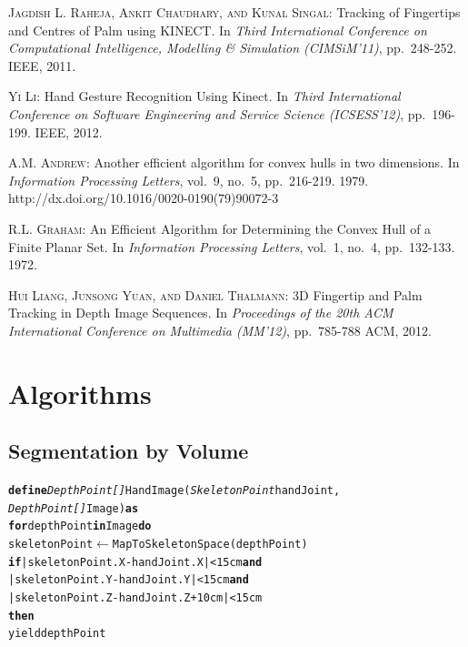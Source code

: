 \documentclass[12pt]{article}
\begin{document}
\begin{thebibliography}{9}

\textsc{Jagdish L. Raheja, Ankit Chaudhary, and Kunal Singal}:
Tracking of Fingertips and Centres of Palm using KINECT.
In \textit{Third International Conference on Computational Intelligence, Modelling \& Simulation (CIMSiM'11)},
pp.~248-252.
IEEE, 2011.

\textsc{Yi Li}:
Hand Gesture Recognition Using Kinect.
In \textit{Third International Conference on Software Engineering and Service Science (ICSESS'12)},
pp.~196-199.
IEEE, 2012.

\textsc{A.M. Andrew}:
Another efficient algorithm for convex hulls in two dimensions.
In \textit{Information Processing Letters},
vol.~9, no.~5, pp.~216-219.
1979.
http://dx.doi.org/10.1016/0020-0190(79)90072-3

\textsc{R.L. Graham}:
An Efficient Algorithm for Determining the Convex Hull of a Finite Planar Set.
In \textit{Information Processing Letters},
vol.~1, no.~4, pp.~132-133.
1972.

\textsc{Hui Liang, Junsong Yuan, and Daniel Thalmann}:
3D Fingertip and Palm Tracking in Depth Image Sequences.
In \textit{Proceedings of the 20th ACM International Conference on Multimedia (MM'12)},
pp.~785-788
ACM, 2012.

\end{thebibliography}


\newpage
\appendix
\section{Algorithms}

\subsection{Segmentation by Volume}
\begin{small}
\begin{alltt}
\textbf{define} \textit{DepthPoint[]} HandImage(\textit{SkeletonPoint} handJoint,
                              \textit{DepthPoint[]} Image) \textbf{as}
    \textbf{for} depthPoint \textbf{in} Image \textbf{do}
        skeletonPoint \(\leftarrow\) MapToSkeletonSpace(depthPoint)
        \textbf{if} |skeletonPoint.X - handJoint.X| < 15cm \textbf{and}
           |skeletonPoint.Y - handJoint.Y| < 15cm \textbf{and}
           |skeletonPoint.Z - handJoint.Z + 10cm| < 15cm
        \textbf{then}
            yield depthPoint
\end{alltt}
\end{small}
\end{document}
